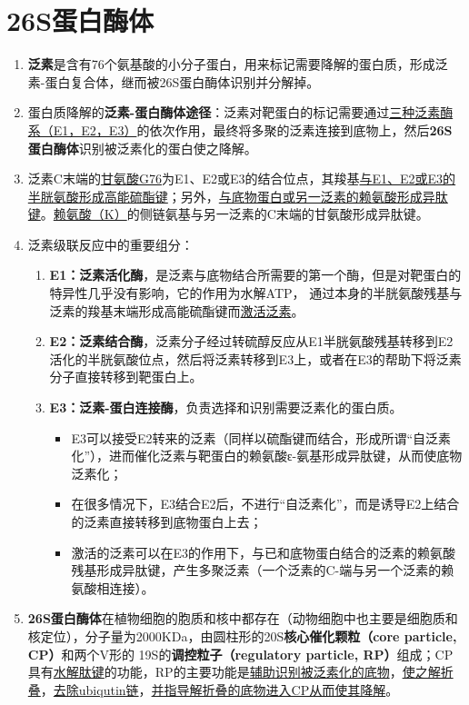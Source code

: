 \section{26S蛋白酶体}
\begin{enumerate}
    \item \textbf{泛素}是含有76个氨基酸的小分子蛋白，用来标记需要降解的蛋白质，形成泛素-蛋白复合体，继而被26S蛋白酶体识别并分解掉。
    \item 蛋白质降解的\textbf{泛素-蛋白酶体途径}：泛素对靶蛋白的标记需要通过\uline{三种泛素酶系（E1，E2，E3）}的依次作用，最终将多聚的泛素连接到底物上，然后\textbf{26S蛋白酶体}识别被泛素化的蛋白使之降解。
    \item 泛素C末端的\uline{甘氨酸G76}为E1、E2或E3的结合位点，其羧基\uline{与E1、E2或E3的半胱氨酸形成高能硫酯键}；另外，\uline{与底物蛋白或另一泛素的赖氨酸形成异肽键}。\uline{赖氨酸（K）}的侧链氨基与另一泛素的C末端的甘氨酸形成异肽键。
    \item 泛素级联反应中的重要组分：
    \begin{enumerate}
        \item \textbf{E1：泛素活化酶}，是泛素与底物结合所需要的第一个酶，但是对靶蛋白的特异性几乎没有影响，它的作用为水解ATP， 通过本身的半胱氨酸残基与泛素的羧基末端形成高能硫酯键而\uline{激活泛素}。
        \item \textbf{E2：泛素结合酶}，泛素分子经过转硫醇反应从E1半胱氨酸残基转移到E2活化的半胱氨酸位点，然后将泛素转移到E3上，或者在E3的帮助下将泛素分子直接转移到靶蛋白上。
        \item \textbf{E3：泛素-蛋白连接酶}，负责选择和识别需要泛素化的蛋白质。
        \begin{itemize}
            \item E3可以接受E2转来的泛素（同样以硫酯键而结合，形成所谓“自泛素化”），进而催化泛素与靶蛋白的赖氨酸ԑ-氨基形成异肽键，从而使底物泛素化；
            \item 在很多情况下，E3结合E2后，不进行“自泛素化”，而是诱导E2上结合的泛素直接转移到底物蛋白上去；
            \item 激活的泛素可以在E3的作用下，与已和底物蛋白结合的泛素的赖氨酸残基形成异肽键，产生多聚泛素（一个泛素的C-端与另一个泛素的赖氨酸相连接）。
        \end{itemize}
    \end{enumerate}
    \item \textbf{26S蛋白酶体}在植物细胞的胞质和核中都存在（动物细胞中也主要是细胞质和核定位），分子量为2000KDa，由圆柱形的20S\textbf{核心催化颗粒（core particle, CP）}和两个V形的 19S的\textbf{调控粒子（regulatory particle, RP）}组成；CP具有\uline{水解肽键}的功能，RP的主要功能是\uline{辅助识别被泛素化的底物}，\uline{使之解折叠}，\uline{去除ubiqutin链}，\uline{并指导解折叠的底物进入CP从而使其降解}。
\end{enumerate}

